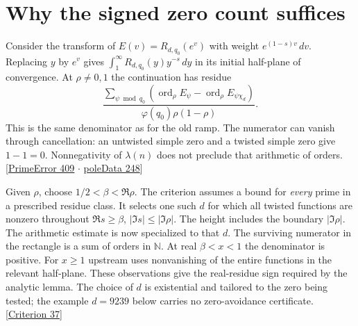 \documentclass[12pt,letterpaper]{article}
\begin{document}
\section{Why the signed zero count suffices}\label{sec:analytic}
Consider the transform of $E(v)=R_{d,q_0}(e^v)$ with weight $e^{(1-s)v}\,dv$. Replacing $y$ by $e^v$ gives $\int_1^\infty R_{d,q_0}(y)y^{-s}\,dy$ in its initial half-plane of convergence. At $\rho\ne0,1$ the continuation has residue
\[
 \frac{\sum_{\psi\bmod q_0}
 (\operatorname{ord}_\rho E_\psi-\operatorname{ord}_\rho E_{\psi\chi_d})}
 {\varphi(q_0)\rho(1-\rho)} .
\]
This is the same denominator as for the old ramp. The numerator can vanish through cancellation: an untwisted simple zero and a twisted simple zero give $1-1=0$. Nonnegativity of $\lambda(n)$ does not preclude that arithmetic of orders. {\small\sffamily\color{mute}[\href{https://github.com/leanprover-community/riemann-hypothesis/blob/e063a923620ee7787b4a1270421478645bf66bdb/src/New/Reduction/Zeros/PrimeError.lean#L409}{PrimeError 409} $\cdot$ \href{https://github.com/nousentllc/riemann-hypothesis/blob/40e56bab026552e089d7afcfeff08d2defb9c005/src/Development/AutomorphicArithmetic/DedekindLFunctions/LandauTheorems/poleData.lean#L248}{poleData 248}]}

Given $\rho$, choose $1/2<\beta<\Re\rho$. The criterion assumes a bound for \emph{every} prime in a prescribed residue class. It selects one such $d$ for which all twisted functions are nonzero throughout $\Re s\ge\beta$, $|\Im s|\le|\Im\rho|$. The height includes the boundary $|\Im\rho|$. The arithmetic estimate is now specialized to that $d$. The surviving numerator in the rectangle is a sum of orders in $\mathbb N$. At real $\beta<x<1$ the denominator is positive. For $x\ge1$ upstream uses nonvanishing of the entire functions in the relevant half-plane. These observations give the real-residue sign required by the analytic lemma. The choice of $d$ is existential and tailored to the zero being tested; the example $d=9239$ below carries no zero-avoidance certificate. {\small\sffamily\color{mute}[\href{https://github.com/leanprover-community/riemann-hypothesis/blob/e063a923620ee7787b4a1270421478645bf66bdb/src/New/Reduction/Zeros/Criterion.lean#L37}{Criterion 37}]}
\end{document}
